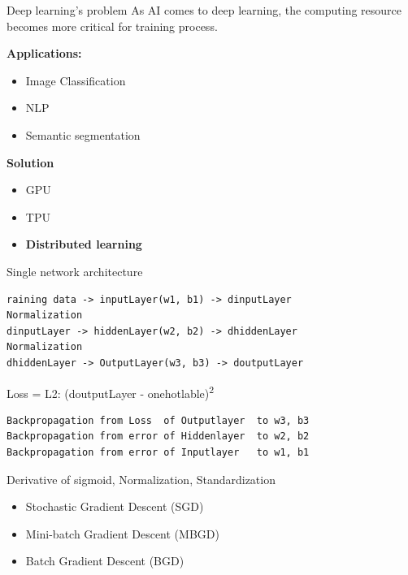 \documentclass[presentation]{beamer}
\begin{document}
\begin{frame}[label={sec:orge3da525}]{Deep learning's problem}
As AI comes to deep learning, the computing resource becomes more critical for training process.

\textbf{Applications:}
\begin{itemize}
\item Image Classification
\item NLP
\item Semantic segmentation
\end{itemize}

\textbf{Solution}
\begin{itemize}
\item GPU
\item TPU
\item \textbf{Distributed learning}
\end{itemize}
\end{frame}

\begin{frame}[label={sec:org22d3c14},fragile]{Single network architecture}
 \begin{verbatim}
raining data -> inputLayer(w1, b1) -> dinputLayer
Normalization
dinputLayer -> hiddenLayer(w2, b2) -> dhiddenLayer
Normalization
dhiddenLayer -> OutputLayer(w3, b3) -> doutputLayer
\end{verbatim}
Loss = L2: (doutputLayer - onehotlable)\textsuperscript{2}
\begin{verbatim}
Backpropagation from Loss  of Outputlayer  to w3, b3
Backpropagation from error of Hiddenlayer  to w2, b2
Backpropagation from error of Inputlayer   to w1, b1
\end{verbatim}

Derivative of sigmoid, Normalization, Standardization

\begin{itemize}
\item Stochastic Gradient Descent (SGD)
\item Mini-batch Gradient Descent (MBGD)
\item Batch Gradient Descent (BGD)
\end{itemize}
\end{frame}
\end{document}
